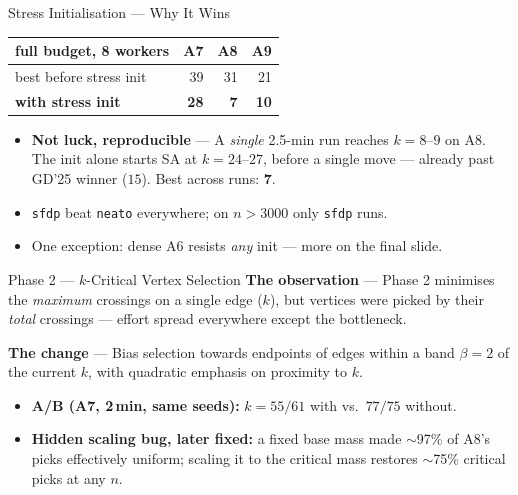 \begin{frame}{Stress Initialisation --- Why It Wins}
  \begin{center}
    \begin{tabular}{lrrr}
      \toprule
      full budget, 8 workers & A7 & A8 & A9 \\
      \midrule
      best before stress init   & 39 & 31 & 21 \\
      \textbf{with stress init}  & \textbf{28} & \textbf{7} & \textbf{10} \\
      \bottomrule
    \end{tabular}
  \end{center}
  \medskip
  \begin{itemize}
    \item \textbf{Not luck, reproducible} --- A \emph{single} 2.5-min run reaches
          $k=8\text{--}9$ on A8. The init alone starts SA at $k=24\text{--}27$, before
          a single move --- already past GD'25 winner ($15$). Best across runs: $\mathbf{7}$.
    \item \texttt{sfdp} beat \texttt{neato} everywhere; on $n>3000$ only \texttt{sfdp} runs.
    \item One exception: dense A6 resists \emph{any} init --- more on the final slide.
  \end{itemize}
\end{frame}

\begin{frame}{Phase 2 --- $k$-Critical Vertex Selection}
  \textbf{The observation} --- Phase 2 minimises the \emph{maximum} crossings on a
  single edge ($k$), but vertices were picked by their \emph{total} crossings ---
  effort spread everywhere except the bottleneck.
  \medskip

  \textbf{The change} --- Bias selection towards endpoints of edges within a band
  $\beta=2$ of the current $k$, with quadratic emphasis on proximity to $k$.
  \begin{itemize}
    \item \textbf{A/B (A7, 2\,min, same seeds):} $k=55/61$ with vs.\ $77/75$ without.
    \item \textbf{Hidden scaling bug, later fixed:} a fixed base mass made $\sim$97\%
          of A8's picks effectively uniform; scaling it to the critical mass restores
          $\sim$75\% critical picks at any $n$.
  \end{itemize}
\end{frame}

